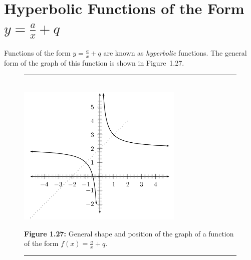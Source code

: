     
    
  
      \label{m39341*uid137}
            \section{ Hyperbolic Functions of the Form $y=\frac{a}{x}+q$}
            \nopagebreak
        
        \label{m39341*id246121}Functions of the form \begin{math}y=\frac{a}{x}+q\end{math} are known as \textsl{hyperbolic} functions. The general form of the graph of this function is shown in Figure~1.27.\par 
        
    \setcounter{subfigure}{0}


	\begin{figure}[H] %
    \begin{center}
    \rule[.1in]{\figurerulewidth}{.005in} \\
        \label{m39341*uid138!!!underscore!!!media}\label{m39341*uid138!!!underscore!!!printimage}\includegraphics[width=300px]{col11306.imgs/m39341_MG10C11_021.png} %
        
      \vspace{2pt}
    \vspace{\rubberspace}\par \begin{cnxcaption}
	  \small \textbf{Figure 1.27: }General shape and position of the graph of a function of the form \begin{math}f\left(x\right)=\frac{a}{x}+q\end{math}.
	\end{cnxcaption}
      
    \vspace{.1in}
    \rule[.1in]{\figurerulewidth}{.005in} \\
        
    \end{center}

 \end{figure}   

